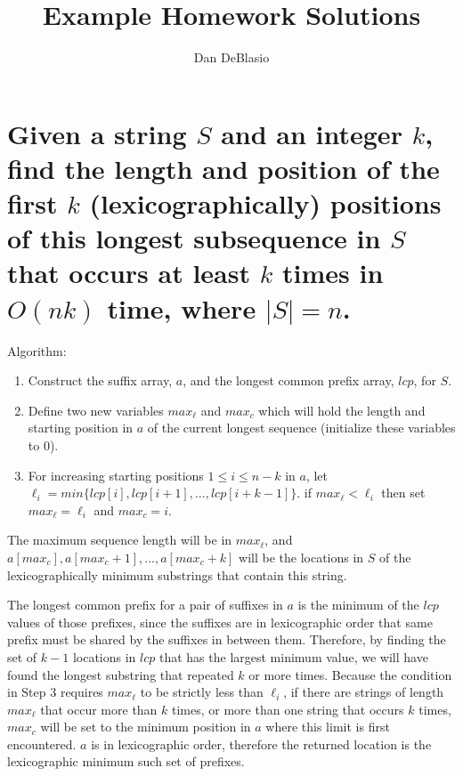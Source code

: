 \documentclass[11pt, oneside]{article}   	%
\title{Example Homework Solutions}
\author{Dan DeBlasio}
\date{}							%
\begin{document}
\maketitle

\section{Given a string $S$ and an integer $k$, find the length and position of the first $k$ (lexicographically) positions of this longest subsequence in $S$ that occurs at least $k$ times in $O(nk)$ time, where $|S|=n$.}

Algorithm:
\begin{enumerate}
\item Construct the suffix array, $a$, and the longest common prefix array, $lcp$, for $S$. 
\item Define two new variables $max_\ell$ and $max_c$ which will hold the length and starting position in $a$ of the current longest sequence (initialize these variables to $0$).
\item For increasing starting positions $1 \le i \le n - k$ in $a$, let $\ell_i = min\{lcp[i],lcp[i+1],...,lcp[i+k-1]\}$. if $max_\ell < \ell_i$ then set $max_\ell = \ell_i$ and $max_c=i$.
\end{enumerate}
The maximum sequence length will be in $max_\ell$, and $a[max_c], a[max_c+1], ..., a[max_c+k]$ will be the locations in $S$ of the lexicographically minimum substrings that contain this string.

The longest common prefix for a pair of suffixes in $a$ is the minimum of the $lcp$ values of those prefixes, 
since the suffixes are in lexicographic order that same prefix must be shared by the suffixes in between them. 
Therefore, by finding the set of $k-1$ locations in $lcp$ that has the largest minimum value, we will have found the longest substring that repeated $k$ or more times.
Because the condition in Step 3 requires $max_\ell$ to be strictly less than $\ell_i$, if there are strings of length $max_\ell$ that occur more than $k$ times, or more than one string that occurs $k$ times, 
$max_c$ will be set to the minimum position in $a$ where this limit is first encountered. 
$a$ is in lexicographic order, therefore the returned location is the lexicographic minimum such set of prefixes. 
\end{document}
